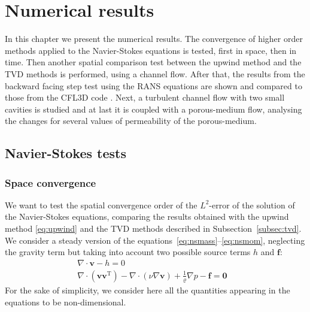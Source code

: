 \chapter{Numerical results} \label{chap:results}
In this chapter we present the numerical results. The convergence of higher 
order methods applied to the Navier-Stokes equations is tested, first in space, 
then in time. Then another spatial comparison test between the upwind method 
and the TVD methods is performed, using a channel flow. After that, the results 
from the backward facing step test using the RANS equations are shown and 
compared to those from the CFL3D code \cite{web:nasa}. Next, a turbulent 
channel flow with two small cavities is studied and at last it is coupled
with a porous-medium flow, analysing the changes for several values of permeability of the porous-medium.
%
\section{Navier-Stokes tests}
\subsection{Space convergence} \label{subsec:conv}
We want to test the spatial convergence order of the $L^2$-error of the 
solution of the Navier-Stokes equations, comparing the results obtained with 
the upwind method \eqref{eq:upwind} and the TVD methods described in 
Subsection~\ref{subsec:tvd}.\\
We consider a steady version of the 
equations~\eqref{eq:nsmass}--\eqref{eq:nsmom}, neglecting the gravity term but taking into account two possible source terms $h$ and $\mathbf{f}$:
\begin{align}
	\label{eq:nssteadymass} \nabla \cdot \mathbf{v} -h = 0&\\
	\label{eq:nssteadymom} \nabla \cdot (\mathbf{v} \mathbf{v}^\mathrm{T}) - 
	\nabla \cdot (\nu \nabla \mathbf{v}) + \frac{1}{\varrho}\nabla p  
	-\mathbf{f} = \mathbf{0}&
\end{align}
For the sake of simplicity, we consider here 
all the quantities appearing in the equations to be non-dimensional.
%
